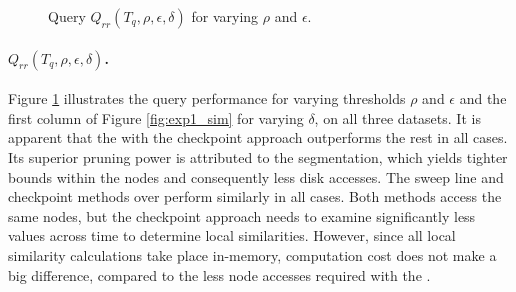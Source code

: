 \begin{figure}[!tb]
 \quad
{}
\caption{Query $Q_{rr}(T_q, \rho, \epsilon, \delta)$ for varying $\rho$ and $\epsilon$.}
\label{fig:query1a}
\end{figure}

\paragraph{$Q_{rr}(T_q, \rho, \epsilon, \delta)$.} Figure \ref{fig:query1a} illustrates the query performance for varying thresholds $\rho$ and $\epsilon$ and the first column of Figure \ref{fig:exp1_sim} for varying $\delta$, on all three datasets. It is apparent that the \sbtsr with the checkpoint approach outperforms the rest in all cases. Its superior pruning power is attributed to the segmentation, which yields tighter bounds within the nodes and consequently less disk accesses. The sweep line and checkpoint methods over \btsr perform similarly in all cases. Both methods access the same nodes, but the checkpoint approach needs to examine significantly less values across time to determine local similarities. However, since all local similarity calculations take place in-memory, computation cost does not make a big difference, compared to the less node accesses required with the \sbtsr. 


